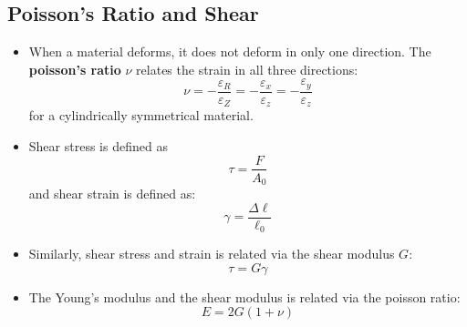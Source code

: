 \subsection{Poisson's Ratio and Shear}
\begin{itemize}
    \item When a material deforms, it does not deform in only one direction. The \textbf{poisson's ratio} $\nu$ relates the strain in all three directions:
    \begin{equation}
        \nu = -\frac{\varepsilon_R}{\varepsilon_Z}=-\frac{\varepsilon_x}{\varepsilon_z}=-\frac{\varepsilon_y}{\varepsilon_z}
    \end{equation}
    for a cylindrically symmetrical material.
    \item Shear stress is defined as
    \begin{equation}
        \tau = \frac{F}{A_0}
    \end{equation}
    and shear strain is defined as:
    \begin{equation}
        \gamma = \frac{\Delta \ell}{\ell_0}
    \end{equation}
    \item Similarly, shear stress and strain is related via the shear modulus $G$:
    \begin{equation}
        \tau = G\gamma
    \end{equation}
    \item The Young's modulus and the shear modulus is related via the poisson ratio:
    \begin{equation}
        E = 2G(1+\nu)
    \end{equation}
\end{itemize}